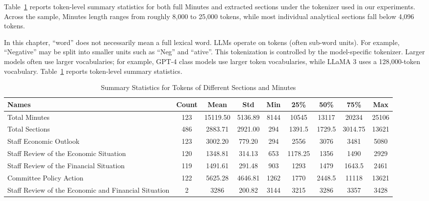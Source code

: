 Table~\ref{tab:ch2:summary_statis} reports token-level summary statistics for both full Minutes and extracted sections under the tokenizer used in our experiments. Across the sample, Minutes length ranges from roughly 8,000 to 25,000 tokens, while most individual analytical sections fall below 4,096 tokens.


In this chapter, ``word'' does not necessarily mean a full lexical word. LLMs operate on tokens (often sub-word units). For example, ``Negative'' may be split into smaller units such as ``Neg'' and ``ative''. This tokenization is controlled by the model-specific tokenizer. Larger models often use larger vocabularies; for example, GPT-4 class models use larger token vocabularies, while LLaMA 3 uses a 128,000-token vocabulary. Table~\ref{tab:ch2:summary_statis} reports token-level summary statistics.


\begin{table}[htbp]
    \scriptsize
    \centering
    \begin{tabular}{p{3.8cm}cccccccc}
        \toprule
        Names&                                                Count&	    Mean&	    Std&	 Min&	   25\%&	  50\%&	   75\%&	Max \\
        \hline
        Total Minutes&	                                        123&	15119.50&	5136.89&	8144&	  10545&	 13117&	  20234&	25106 \\
        Total Sections&	                                        486&	 2883.71&	2921.00&	 294&	 1391.5&	1729.5&	3014.75&	13621\\
        Staff Economic Outlook&	                                123&	 3002.20&	 779.20&	 294&	   2556&	  3076&	   3481&	5080 \\
        Staff Review of the Economic Situation&	                120&	 1348.81&	 314.13&	 653&	1178.25&	  1356&	   1490&	2929 \\
        Staff Review of the Financial Situation&	            119&	 1491.61&	 291.48&	 903&	   1293&	  1479&	 1643.5&	2461 \\
        Committee Policy Action&	                            122&	 5625.28&	4646.81&	1262&	   1770&	2448.5&	  11118&	13621 \\
        Staff Review of the Economic and Financial Situation&	  2&	    3286&	 200.82&	3144&	   3215&	  3286&	   3357&	3428 \\
        \bottomrule
    \end{tabular}
    \caption{Summary Statistics for Tokens of Different Sections and Minutes}
    \label{tab:ch2:summary_statis}
\end{table}


